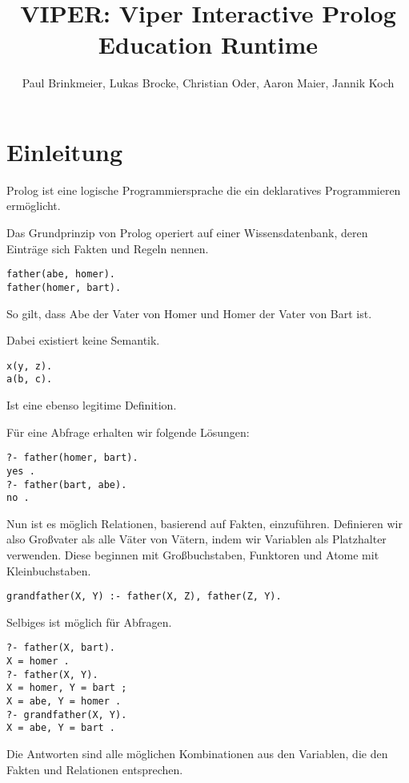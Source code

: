 \documentclass[parskip=full,11pt,twoside]{scrartcl}
\title{VIPER: Viper Interactive Prolog Education Runtime}
\author{Paul Brinkmeier, Lukas Brocke, Christian Oder, Aaron Maier, Jannik Koch}
\begin{document}
\maketitle
\newpage

\section{Einleitung}

Prolog ist eine logische Programmiersprache die ein deklaratives Programmieren ermöglicht.

Das Grundprinzip von Prolog operiert auf einer Wissensdatenbank, deren Einträge sich Fakten und Regeln nennen.

\begin{lstlisting}
father(abe, homer).
father(homer, bart).
\end{lstlisting}

So gilt, dass Abe der Vater von Homer und Homer der Vater von Bart ist.

Dabei existiert keine Semantik.

\begin{lstlisting}
x(y, z).
a(b, c).
\end{lstlisting}

Ist eine ebenso legitime Definition.

Für eine Abfrage erhalten wir folgende Lösungen:

\begin{lstlisting}
?- father(homer, bart).
yes .
?- father(bart, abe).
no .
\end{lstlisting}

Nun ist es möglich Relationen, basierend auf Fakten, einzuführen. Definieren wir also Großvater als alle Väter von Vätern, indem wir Variablen als Platzhalter verwenden. Diese beginnen mit Großbuchstaben, Funktoren und Atome mit Kleinbuchstaben.

\begin{lstlisting}
grandfather(X, Y) :- father(X, Z), father(Z, Y).
\end{lstlisting}

Selbiges ist möglich für Abfragen.

\begin{lstlisting}
?- father(X, bart).
X = homer .
?- father(X, Y).
X = homer, Y = bart ;
X = abe, Y = homer .
?- grandfather(X, Y).
X = abe, Y = bart .
\end{lstlisting}

Die Antworten sind alle möglichen Kombinationen aus den Variablen, die den Fakten und Relationen entsprechen.
\end{document}
